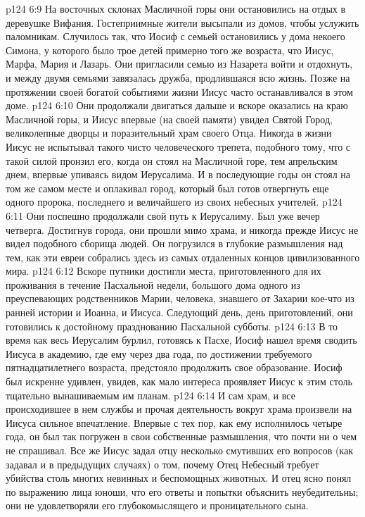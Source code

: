 \vs p124 6:9 На восточных склонах Масличной горы они остановились на отдых в деревушке Вифания. Гостеприимные жители высыпали из домов, чтобы услужить паломникам. Случилось так, что Иосиф с семьей остановились у дома некоего Симона, у которого было трое детей примерно того же возраста, что Иисус, Марфа, Мария и Лазарь. Они пригласили семью из Назарета войти и отдохнуть, и между двумя семьями завязалась дружба, продлившаяся всю жизнь. Позже на протяжении своей богатой событиями жизни Иисус часто останавливался в этом доме.
\vs p124 6:10 Они продолжали двигаться дальше и вскоре оказались на краю Масличной горы, и Иисус впервые (на своей памяти) увидел Святой Город, великолепные дворцы и поразительный храм своего Отца. Никогда в жизни Иисус не испытывал такого чисто человеческого трепета, подобного тому, что с такой силой пронзил его, когда он стоял на Масличной горе, тем апрельским днем, впервые упиваясь видом Иерусалима. И в последующие годы он стоял на том же самом месте и оплакивал город, который был готов отвергнуть еще одного пророка, последнего и величайшего из своих небесных учителей.
\vs p124 6:11 Они поспешно продолжали свой путь к Иерусалиму. Был уже вечер четверга. Достигнув города, они прошли мимо храма, и никогда прежде Иисус не видел подобного сборища людей. Он погрузился в глубокие размышления над тем, как эти евреи собрались здесь из самых отдаленных концов цивилизованного мира.
\vs p124 6:12 Вскоре путники достигли места, приготовленного для их проживания в течение Пасхальной недели, большого дома одного из преуспевающих родственников Марии, человека, знавшего от Захарии кое\hyp{}что из ранней истории и Иоанна, и Иисуса. Следующий день, день приготовлений, они готовились к достойному празднованию Пасхальной субботы.
\vs p124 6:13 В то время как весь Иерусалим бурлил, готовясь к Пасхе, Иосиф нашел время сводить Иисуса в академию, где ему через два года, по достижении требуемого пятнадцатилетнего возраста, предстояло продолжить свое образование. Иосиф был искренне удивлен, увидев, как мало интереса проявляет Иисус к этим столь тщательно вынашиваемым им планам.
\vs p124 6:14 И сам храм, и все происходившее в нем службы и прочая деятельность вокруг храма произвели на Иисуса сильное впечатление. Впервые с тех пор, как ему исполнилось четыре года, он был так погружен в свои собственные размышления, что почти ни о чем не спрашивал. Все же Иисус задал отцу несколько смутивших его вопросов (как задавал и в предыдущих случаях) о том, почему Отец Небесный требует убийства столь многих невинных и беспомощных животных. И отец ясно понял по выражению лица юноши, что его ответы и попытки объяснить неубедительны; они не удовлетворяли его глубокомыслящего и проницательного сына.
